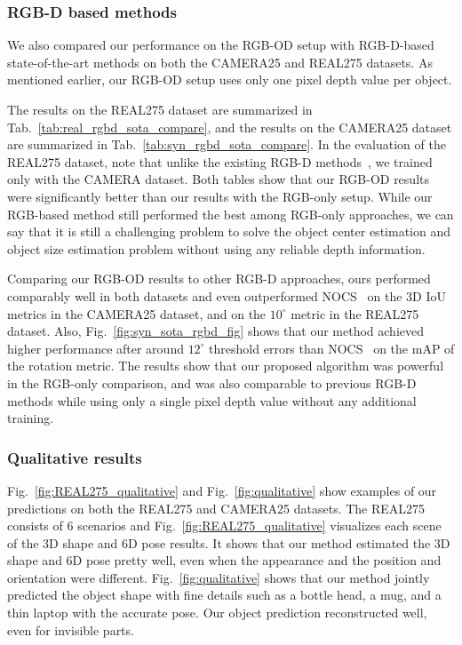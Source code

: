 \documentclass[letterpaper, 10 pt, journal, twoside]{IEEEtran}
\newcommand{\figref}[1]{Fig.~\ref{#1}}
\newcommand{\tabref}[1]{Tab.~\ref{#1}}
\begin{document}
\subsubsection{RGB-D based methods}
\label{subsec:sota_comparison_rgbd}
We also compared our performance on the RGB-OD setup with RGB-D-based state-of-the-art methods on both the CAMERA25 and REAL275 datasets.
As mentioned earlier, our RGB-OD setup uses only one pixel depth value per object.

The results on the REAL275 dataset are summarized in \tabref{tab:real_rgbd_sota_compare}, and the results on the CAMERA25 dataset are summarized in \tabref{tab:syn_rgbd_sota_compare}.
In the evaluation of the REAL275 dataset, note that unlike the existing RGB-D methods~\cite{wang2019normalized, Tian2020prior}, we trained only with the CAMERA dataset.
Both tables show that our RGB-OD results were significantly better than our results with the RGB-only setup.
While our RGB-based method still performed the best among RGB-only approaches, we can say that it is still a challenging problem to solve the object center estimation and object size estimation problem without using any reliable depth information.

Comparing our RGB-OD results to other RGB-D approaches, ours performed comparably well in both datasets and even outperformed NOCS~\cite{wang2019normalized} on the 3D IoU metrics in the CAMERA25 dataset, and on the $10^\circ$ metric in the REAL275 dataset.
Also, \figref{fig:syn_sota_rgbd_fig} shows that our method achieved higher performance after around $12^\circ$ threshold errors than NOCS~\cite{wang2019normalized} on the mAP of the rotation metric.
The results show that our proposed algorithm was powerful in the RGB-only comparison, and was also comparable to previous RGB-D methods while using only a single pixel depth value without any additional training.



\subsubsection{Qualitative results}
\figref{fig:REAL275_qualitative} and \figref{fig:qualitative} show examples of our predictions on both the REAL275 and CAMERA25 datasets.
The REAL275 consists of 6 scenarios and \figref{fig:REAL275_qualitative} visualizes each scene of the 3D shape and 6D pose results.
It shows that our method estimated the 3D shape and 6D pose pretty well, even when the appearance and the position and orientation were different.
\figref{fig:qualitative} shows that our method jointly predicted the object shape with fine details such as a bottle head, a mug, and a thin laptop with the accurate pose.
Our object prediction reconstructed well, even for invisible parts.
\end{document}
